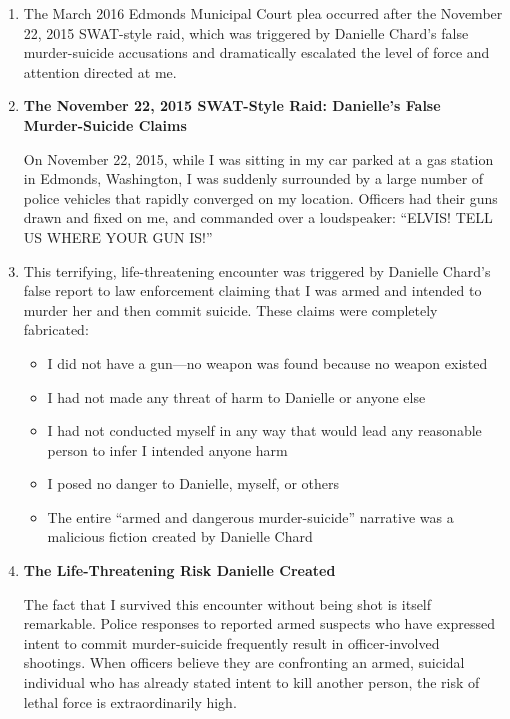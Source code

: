 \documentclass[12pt,letterpaper]{article}
\begin{document}
\begin{enumerate}

\item The March 2016 Edmonds Municipal Court plea occurred after the November 22, 2015 SWAT-style raid, which was triggered by Danielle Chard's false murder-suicide accusations and dramatically escalated the level of force and attention directed at me.

\item \textbf{The November 22, 2015 SWAT-Style Raid: Danielle's False Murder-Suicide Claims}

On November 22, 2015, while I was sitting in my car parked at a gas station in Edmonds, Washington, I was suddenly surrounded by a large number of police vehicles that rapidly converged on my location. Officers had their guns drawn and fixed on me, and commanded over a loudspeaker: ``ELVIS! TELL US WHERE YOUR GUN IS!''

\item This terrifying, life-threatening encounter was triggered by Danielle Chard's false report to law enforcement claiming that I was armed and intended to murder her and then commit suicide. These claims were completely fabricated:

\begin{itemize}
\item I did not have a gun---no weapon was found because no weapon existed
\item I had not made any threat of harm to Danielle or anyone else
\item I had not conducted myself in any way that would lead any reasonable person to infer I intended anyone harm
\item I posed no danger to Danielle, myself, or others
\item The entire ``armed and dangerous murder-suicide'' narrative was a malicious fiction created by Danielle Chard
\end{itemize}

\item \textbf{The Life-Threatening Risk Danielle Created}

The fact that I survived this encounter without being shot is itself remarkable. Police responses to reported armed suspects who have expressed intent to commit murder-suicide frequently result in officer-involved shootings. When officers believe they are confronting an armed, suicidal individual who has already stated intent to kill another person, the risk of lethal force is extraordinarily high.


\end{enumerate}
\end{document}
